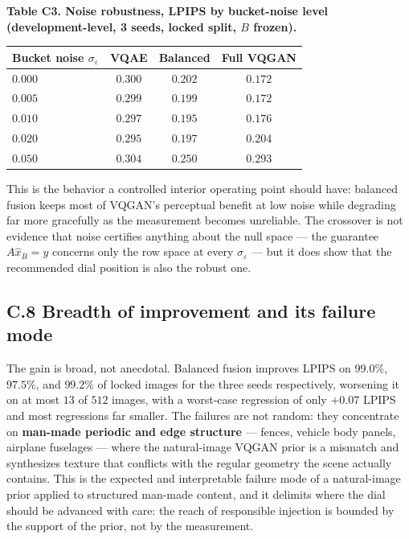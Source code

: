 \documentclass[11pt]{article}
\begin{document}
\textbf{Table C3. Noise robustness, LPIPS by bucket-noise level (development-level, 3 seeds, locked split, $B$ frozen).}

\begin{center}\begin{tabular}{lccc}
\toprule
Bucket noise $\sigma_\varepsilon$ & VQAE & Balanced & Full VQGAN \\
\midrule
$0.000$ & $0.300$ & $0.202$ & $0.172$ \\
$0.005$ & $0.299$ & $0.199$ & $0.172$ \\
$0.010$ & $0.297$ & $0.195$ & $0.176$ \\
$0.020$ & $0.295$ & $0.197$ & $0.204$ \\
$0.050$ & $0.304$ & $0.250$ & $0.293$ \\
\bottomrule
\end{tabular}\end{center}


This is the behavior a controlled interior operating point should have: balanced fusion keeps most of VQGAN's perceptual benefit at low noise while degrading far more gracefully as the measurement becomes unreliable. The crossover is not evidence that noise certifies anything about the null space --- the guarantee $A\hat{x}_B = y$ concerns only the row space at every $\sigma_\varepsilon$ --- but it does show that the recommended dial position is also the robust one.

\subsection*{C.8 Breadth of improvement and its failure mode}

The gain is broad, not anecdotal. Balanced fusion improves LPIPS on $99.0\%$, $97.5\%$, and $99.2\%$ of locked images for the three seeds respectively, worsening it on at most $13$ of $512$ images, with a worst-case regression of only $+0.07$ LPIPS and most regressions far smaller. The failures are not random: they concentrate on \textbf{man-made periodic and edge structure} --- fences, vehicle body panels, airplane fuselages --- where the natural-image VQGAN prior is a mismatch and synthesizes texture that conflicts with the regular geometry the scene actually contains. This is the expected and interpretable failure mode of a natural-image prior applied to structured man-made content, and it delimits where the dial should be advanced with care: the reach of responsible injection is bounded by the support of the prior, not by the measurement.
\end{document}
